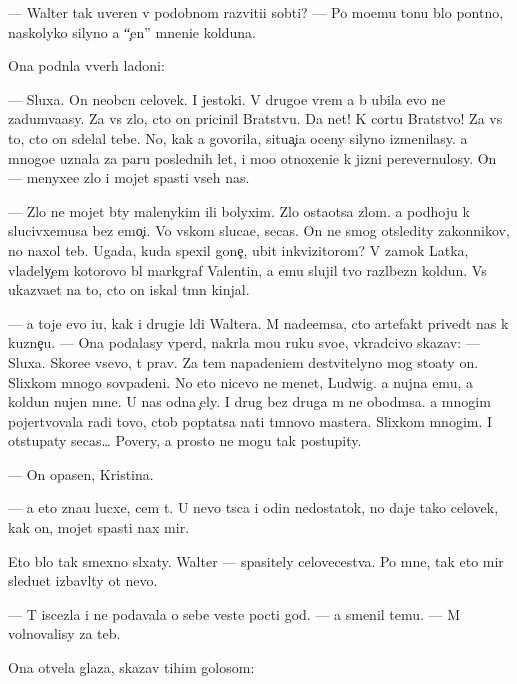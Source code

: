 \documentclass[10pt]{book}
\begin{document}
— Walter tak uveren v podobnom razviti{\y}i sob{\yi}ti{\y}? — Po mo{\y}emu tonu b{\yi}lo pon{\ia}tno, naskolyko silyno {\y}a ``{\c}en{\io}'' mneni{\y}e kolduna.

Ona podn{\ia}la vverh ladoni:

— Sluxa{\y}. On neob{\yi}cn{\yi}{\y} celovek. I jestoki{\y}. V drugo{\y}e vrem{\ia} {\y}a b{\yi} ubila {\y}evo ne zadum{\yi}va{\y}asy. Za vs{\e} zlo, cto on pricinil Bratstvu. Da net! K cortu Bratstvo! Za vs{\e} to, cto on sdelal tebe. No, kak {\y}a govorila, situa{\c}i{\y}a oceny silyno izmenilasy. {\Y}a mnogo{\y}e uznala za paru poslednih let, i mo{\y}o otnoxeni{\y}e k jizni perevernulosy. On — menyxe{\y}e zlo i mojet spasti vseh nas.

— Zlo ne mojet b{\yi}ty malenykim ili bolyxim. Zlo osta{\y}otsa zlom. {\Y}a podhoju k slucivxemusa bez emo{\c}i{\y}. Vo vs{\ia}kom sluca{\y}e, se{\y}cas. On ne smog otsledity zakonnikov, no naxol teb{\ia}. Ugada{\y}, kuda spexil gone{\c}, ubit{\yi}{\y} inkvizitorom? V zamok Latka, vladely{\c}em kotorovo b{\yi}l markgraf Valentin, a {\y}emu slujil tvo{\y} razl{\io}bezn{\yi}{\y} koldun. Vs{\e} ukaz{\yi}va{\y}et na to, cto on iskal t{\e}mn{\yi}{\y} kinjal.

— {\Y}a toje {\y}evo i{\x}u, kak i drugi{\y}e l{\io}di Waltera. M{\yi} nade{\y}emsa, cto artefakt prived{\e}t nas k kuzne{\c}u. — Ona podalasy vper{\e}d, nakr{\yi}la mo{\y}u ruku svo{\y}e{\y}, vkradcivo skazav: — Sluxa{\y}. Skore{\y}e vsevo, t{\yi} prav. Za tem napadeni{\y}em de{\y}stvitelyno mog sto{\y}aty on. Slixkom mnogo sovpadeni{\y}. No eto nicevo ne men{\ia}{\y}et, Ludwig. {\Y}a nujna {\y}emu, a koldun nujen mne. U nas odna {\c}ely. I drug bez druga m{\yi} ne obo{\y}d{\e}msa. {\Y}a mnogim pojertvovala radi tovo, ctob{\yi} pop{\yi}tatsa na{\y}ti t{\e}mnovo mastera. Slixkom mnogim. I otstupaty se{\y}cas… Povery, {\y}a prosto ne mogu tak postupity.

— On opasen, Kristina.

— {\Y}a eto zna{\y}u lucxe, cem t{\yi}. U nevo t{\yi}s{\ia}ca i odin nedostatok, no daje tako{\y} celovek, kak on, mojet spasti nax mir.

Eto b{\yi}lo tak smexno sl{\yi}xaty. Walter — spasitely celovecestva. Po mne, tak eto mir sledu{\y}et izbavl{\ia}ty ot nevo.

— T{\yi} iscezla i ne podavala o sebe veste{\y} pocti god. — {\Y}a smenil temu. — M{\yi} volnovalisy za teb{\ia}.

Ona otvela glaza, skazav tihim golosom:
\end{document}
